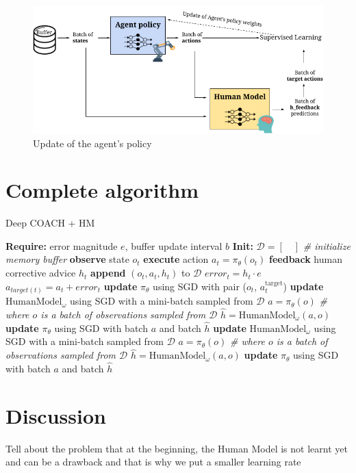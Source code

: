 \begin{figure}[H]
    \centering
    \includegraphics[width=.8\textwidth]{figures/train_agent.png}
    \caption{Update of the agent's policy}
    \label{fig:update_agent}
\end{figure}





\section{Complete algorithm}
\label{section:Complete algorithm}


\begin{algorithm}[H]
\caption{Deep COACH + HM}\label{algorithm:DeepCOACH}
\begin{algorithmic}[1]
\State \textbf{Require:} error magnitude $e$, buffer update interval $b$
\State \textbf{Init:} $\mathcal{D} = [\quad]$  \emph{\# initialize memory buffer}
\State \textbf{observe} state $o_{t}$
\State \textbf{execute} action $a_{t}=\pi_{\theta}(o_{t})$
\State \textbf{feedback} human corrective advice $h_{t}$
\State \textbf{append} $(o_{t}, a_{t}, h_{t})$ to $\mathcal{D}$
\State $\mathit{error}_{t} = h_{t}\cdot e$
\State $a_{target(t)} = a_{t} + \mathit{error}_{t}$
\State \textbf{update} $\pi_\theta$ using SGD with pair ($o_{t}$, $a^{\text{target}}_{t}$)
\State \textbf{update} $\text{HumanModel}_\omega$ using SGD with a mini-batch sampled from $\mathcal{D}$
\State  $a=\pi_{\theta}(o)$ \emph{\# where $o$ is a batch of observations sampled from $\mathcal{D}$}
\State  $\hat{h}=\text{HumanModel}_\omega(a, o)$
\State \textbf{update} $\pi_\theta$ using SGD with batch $a$ and batch $\hat{h}$
\EndIf
{}
\State \textbf{update} $\text{HumanModel}_\omega$ using SGD with a mini-batch sampled from $\mathcal{D}$
\State  $a=\pi_{\theta}(o)$ \emph{\# where $o$ is a batch of observations sampled from $\mathcal{D}$}
\State  $\hat{h}=\text{HumanModel}_\omega(a, o)$
\State \textbf{update} $\pi_{\theta}$ using SGD with batch $a$ and batch $\hat{h}$
\EndIf
\EndFor
\end{algorithmic}
\label{al:D-COACH with HM}
\end{algorithm}


\section{Discussion}
\label{section:Algorithm-Discussion}
Tell about the problem that at the beginning, the Human Model is not learnt yet and can be a drawback and that is why we put a smaller learning rate